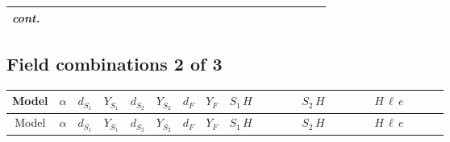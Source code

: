 \documentclass[8pt]{article}
\begin{document}
\begin{landscape}
\begin{longtable}{@{}cccccccc >{\raggedright\arraybackslash}p{0.21\linewidth} >{\raggedright\arraybackslash}p{0.21\linewidth} >{\raggedright\arraybackslash}p{0.21\linewidth}@{}}
\textit{cont.} &  &  &  &  &  &  &  & \scriptsize\adjustbox{max width=\linewidth}{$\begin{gathered} -\frac{4 \hbar  \log \left(\frac{\bar{\mu}^{2}}{m_2^2}\right) \overline{\lambda_5} H_{a_1} H_{a_2} m_2^2 \lambda_5 H_{a_1}{}^{\dagger } H_{a_2}{}^{\dagger }}{3 \left(m_1^2-m_2^2\right)}\end{gathered}$} &  &  \\
\midrule
\bottomrule
\end{longtable}
\clearpage
\subsection*{Field combinations 2 of 3}
\begin{longtable}{@{}cccccccc >{\raggedright\arraybackslash}p{0.21\linewidth} >{\raggedright\arraybackslash}p{0.21\linewidth} >{\raggedright\arraybackslash}p{0.21\linewidth}@{}}
\toprule
Model & $\alpha$ & $d_{S_1}$ & $Y_{S_1}$ & $d_{S_2}$ & $Y_{S_2}$ & $d_F$ & $Y_F$ & $S_1\,H$ & $S_2\,H$ & $H\,\ell\,e$ \\
\midrule
\endfirsthead
\toprule
Model & $\alpha$ & $d_{S_1}$ & $Y_{S_1}$ & $d_{S_2}$ & $Y_{S_2}$ & $d_F$ & $Y_F$ & $S_1\,H$ & $S_2\,H$ & $H\,\ell\,e$ \\
\midrule
\endhead

\end{longtable}
\end{landscape}
\end{document}
